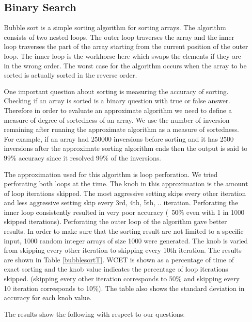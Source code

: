 \subsection{Binary Search}
Bubble sort is a simple sorting algorithm for sorting arrays. The algorithm consists of two nested loops. The outer loop traverses the array and the inner loop traverses the part of the array starting from the current position of the outer loop. The inner loop is the workhorse here which swaps the elements if they are in the wrong order. The worst case for the algorithm occurs when the array to be sorted is actually sorted in the reverse order.

One important question about sorting is measuring the accuracy of sorting. Checking if an array is sorted is a binary question with true or false answer. Therefore in order to evaluate an approximate algorithm we need to define a measure of degree of sortedness of an array. We use the number of inversion remaining after running the approximate algorithm as a measure of sortedness. For example, if an array had 250000 inversions before sorting and it has 2500 inversions after the approximate sorting algorithm ends then the output is said to 99\% accuracy since it resolved 99\% of the inversions.

The approximation used for this algorithm is loop perforation. We tried perforating both loops at the time. The knob in this approximation is the amount of loop iterations skipped. The most aggressive setting skips every other iteration and less aggressive setting skip every 3rd, 4th, 5th, .. iteration. Perforating the inner loop consistently resulted in very poor accuracy (~50\% even with 1 in 1000 skipped iterations). Perforating the outer loop of the algorithm gave better results. In order to make sure that the sorting result are not limited to a specific input, 1000 random integer arrays of size 1000 were generated. The knob is varied from skipping every other iteration to skipping every 10th iteration. The results are shown in Table \ref{bubblesortT}. WCET is shown as a percentage of time of exact sorting and the knob value indicates the percentage of loop iterations skipped. (skipping every other iteration corresponds to 50\% and skipping every 10 iteration corresponds to 10\%). The table also shows the standard deviation in accuracy for each knob value.



The results show the following with respect to our questions:

